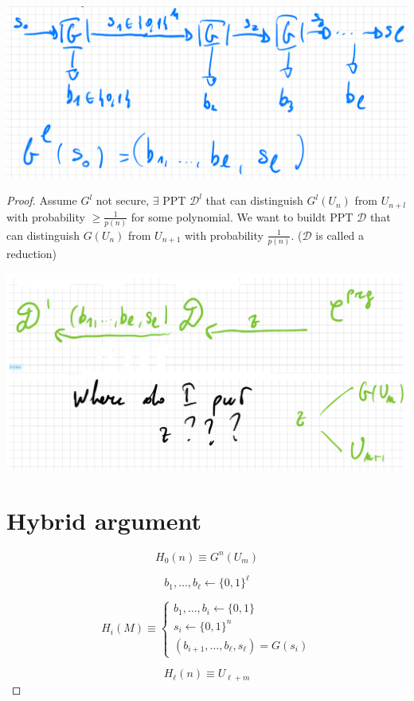 \documentclass[11pt, a4paper]{article}
\begin{document}
\begin{center}
    \includegraphics[scale=0.4]{img/Comp_sec/BlueGen.png}
\end{center}
\begin{proof}
    Assume $G^l$ not secure, $\exists$ PPT $\mathcal{D}^l$ that can distinguish $G^l(U_n)$ from $U_{n+l}$ with probability $\geq \frac{1}{p(n)}$ for some polynomial. We want to buildt PPT $\mathcal{D}$ that can
    distinguish $G(U_n)$ from $U_{n+1}$ with probability $\frac{1}{p(n)}$. ($\mathcal{D}$ is called a reduction)
    \begin{center}
        \includegraphics[scale=0.4]{img/Comp_sec/Hybrid_arg_img.png}
    \end{center}
\section*{Hybrid argument}

\[
H_0(n) \equiv G^{n}(U_m)
\]

\[
b_1, \ldots, b_\ell \leftarrow \{0,1\}^\ell
\]

\[
H_i(M) \equiv
\begin{cases}
b_1, \ldots, b_i \leftarrow \{0,1\} \\
s_i \leftarrow \{0,1\}^n \\
(b_{i+1}, \ldots, b_\ell, s_\ell) = G(s_i)
\end{cases}
\]

\[
H_\ell(n) \equiv U_{\ell + m}
\]

\end{proof}
\end{document}
